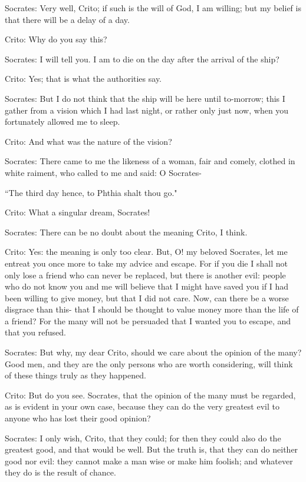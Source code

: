 Socrates: Very well, Crito; if such is the will of God, I am willing; but
my belief is that there will be a delay of a day. 

Crito: Why do you say this? 

Socrates: I will tell you. I am to die on the day after the arrival of
the ship? 

Crito: Yes; that is what the authorities say. 

Socrates: But I do not think that the ship will be here until to-morrow;
this I gather from a vision which I had last night, or rather only
just now, when you fortunately allowed me to sleep. 

Crito: And what was the nature of the vision? 

Socrates: There came to me the likeness of a woman, fair and comely, clothed
in white raiment, who called to me and said: O Socrates-

``The third day hence, to Phthia shalt thou go." 

Crito: What a singular dream, Socrates! 

Socrates: There can be no doubt about the meaning Crito, I think.

Crito: Yes: the meaning is only too clear. But, O! my beloved Socrates,
let me entreat you once more to take my advice and escape. For if
you die I shall not only lose a friend who can never be replaced,
but there is another evil: people who do not know you and me will
believe that I might have saved you if I had been willing to give
money, but that I did not care. Now, can there be a worse disgrace
than this- that I should be thought to value money more than the life
of a friend? For the many will not be persuaded that I wanted you
to escape, and that you refused. 

Socrates: But why, my dear Crito, should we care about the opinion of the
many? Good men, and they are the only persons who are worth considering,
will think of these things truly as they happened. 

Crito: But do you see. Socrates, that the opinion of the many must be
regarded, as is evident in your own case, because they can do the
very greatest evil to anyone who has lost their good opinion?

Socrates: I only wish, Crito, that they could; for then they could also
do the greatest good, and that would be well. But the truth is, that
they can do neither good nor evil: they cannot make a man wise or
make him foolish; and whatever they do is the result of chance.

